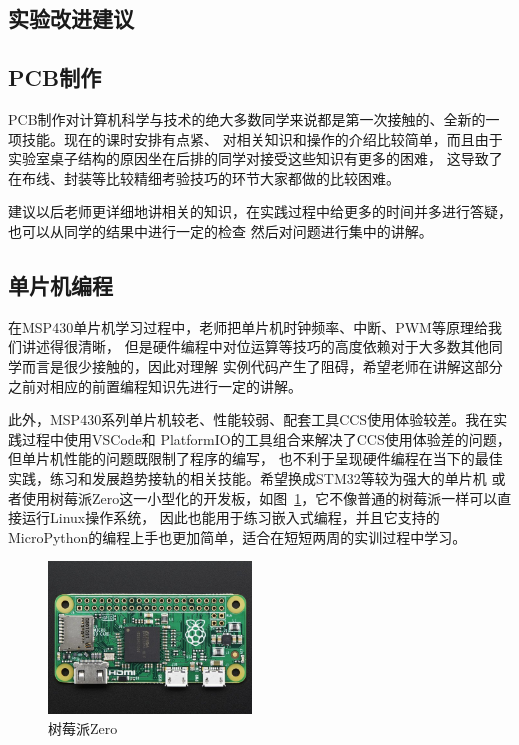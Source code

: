 \documentclass[a4paper,twoside,zihao=5,UTF8]{ctexart}
\begin{document}
\begin{spacing}{1.2}
\clearpage
\section{实验改进建议}

\subsection{PCB制作}

PCB制作对计算机科学与技术的绝大多数同学来说都是第一次接触的、全新的一项技能。现在的课时安排有点紧、
对相关知识和操作的介绍比较简单，而且由于实验室桌子结构的原因坐在后排的同学对接受这些知识有更多的困难，
这导致了在布线、封装等比较精细考验技巧的环节大家都做的比较困难。

建议以后老师更详细地讲相关的知识，在实践过程中给更多的时间并多进行答疑，也可以从同学的结果中进行一定的检查
然后对问题进行集中的讲解。

\subsection{单片机编程}

在MSP430单片机学习过程中，老师把单片机时钟频率、中断、PWM等原理给我们讲述得很清晰，
但是硬件编程中对位运算等技巧的高度依赖对于大多数其他同学而言是很少接触的，因此对理解
实例代码产生了阻碍，希望老师在讲解这部分之前对相应的前置编程知识先进行一定的讲解。

此外，MSP430系列单片机较老、性能较弱、配套工具CCS使用体验较差。我在实践过程中使用VSCode和
PlatformIO的工具组合来解决了CCS使用体验差的问题，但单片机性能的问题既限制了程序的编写，
也不利于呈现硬件编程在当下的最佳实践，练习和发展趋势接轨的相关技能。希望换成STM32等较为强大的单片机
或者使用树莓派Zero这一小型化的开发板，如图~\ref{fig:rpi0}，它不像普通的树莓派一样可以直接运行Linux操作系统，
因此也能用于练习嵌入式编程，并且它支持的MicroPython的编程上手也更加简单，适合在短短两周的实训过程中学习。

\begin{figure}[htb]
	\centering
	\caption{树莓派Zero}
	\label{fig:rpi0}
	\includegraphics[width=0.48\textwidth]{rpi0.jpg}
\end{figure}


\end{spacing}
\end{document}
